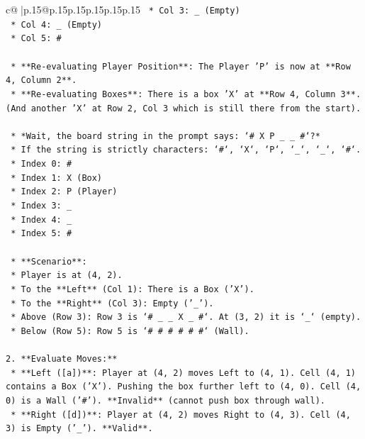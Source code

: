 \documentclass{article}
\begin{document}
{\begin{supertabular}{c@{$\;$}|p{.15\linewidth}@{}p{.15\linewidth}p{.15\linewidth}p{.15\linewidth}p{.15\linewidth}p{.15\linewidth}}
{{{\texttt{        *   Col 3: \_ (Empty)} \\
\texttt{        *   Col 4: \_ (Empty)} \\
\texttt{        *   Col 5: \#} \\
\\ 
\texttt{    *   **Re{-}evaluating Player Position**: The Player 'P' is now at **Row 4, Column 2**.} \\
\texttt{    *   **Re{-}evaluating Boxes**: There is a box 'X' at **Row 4, Column 3**. (And another 'X' at Row 2, Col 3 which is still there from the start).} \\
\\ 
\texttt{    *   *Wait, the board string in the prompt says: `\# X P \_ \_ \#`?*} \\
\texttt{        *   If the string is strictly characters: `\#`, `X`, `P`, `\_`, `\_`, `\#`.} \\
\texttt{        *   Index 0: \#} \\
\texttt{        *   Index 1: X (Box)} \\
\texttt{        *   Index 2: P (Player)} \\
\texttt{        *   Index 3: \_} \\
\texttt{        *   Index 4: \_} \\
\texttt{        *   Index 5: \#} \\
\\ 
\texttt{    *   **Scenario**:} \\
\texttt{        *   Player is at (4, 2).} \\
\texttt{        *   To the **Left** (Col 1): There is a Box ('X').} \\
\texttt{        *   To the **Right** (Col 3): Empty ('\_').} \\
\texttt{        *   Above (Row 3): Row 3 is `\# \_ \_ X \_ \#`. At (3, 2) it is `\_` (empty).} \\
\texttt{        *   Below (Row 5): Row 5 is `\# \# \# \# \# \#` (Wall).} \\
\\ 
\texttt{2.  **Evaluate Moves:**} \\
\texttt{    *   **Left ({[}a{]})**: Player at (4, 2) moves Left to (4, 1). Cell (4, 1) contains a Box ('X'). Pushing the box further left to (4, 0). Cell (4, 0) is a Wall ('\#'). **Invalid** (cannot push box through wall).} \\
\texttt{    *   **Right ({[}d{]})**: Player at (4, 2) moves Right to (4, 3). Cell (4, 3) is Empty ('\_'). **Valid**.} \\
}}}
\end{supertabular}}
\end{document}
